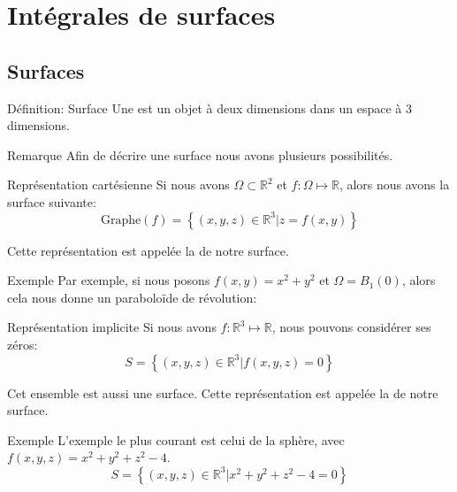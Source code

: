 \documentclass[a4paper]{article}
\begin{document}
\section{Intégrales de surfaces}
\subsection{Surfaces}

\begin{parag}{Définition: Surface}
    Une  est un objet à deux dimensions dans un espace à 3 dimensions. 

    \begin{subparag}{Remarque}
        Afin de décrire une surface nous avons plusieurs possibilités.
    \end{subparag}
\end{parag}

\begin{parag}{Représentation cartésienne}
     Si nous avons $\Omega \subset \mathbb{R}^2$ et $f: \Omega \mapsto \mathbb{R}$, alors nous avons la surface suivante: 
    \[\text{Graphe}\left(f\right) = \left\{\left(x, y, z\right) \in \mathbb{R}^3 | z = f\left(x, y\right)\right\}\]
    
    Cette représentation est appelée la  de notre surface.
   
    \begin{subparag}{Exemple}
        Par exemple, si nous posons $f\left(x, y\right) = x^2 + y^2$ et $\Omega = B_1\left(0\right)$, alors cela nous donne un paraboloïde de révolution:
    \end{subparag}
\end{parag}

\begin{parag}{Représentation implicite}
    Si nous avons $f: \mathbb{R}^3 \mapsto \mathbb{R}$, nous pouvons considérer ses zéros: 
    \[S = \left\{\left(x, y, z\right) \in \mathbb{R}^3 | f\left(x, y, z\right) = 0\right\}\]
    
    Cet ensemble est aussi une surface. Cette représentation est appelée la  de notre surface.

    \begin{subparag}{Exemple}
        L'exemple le plus courant est celui de la sphère, avec $f\left(x, y, z\right) = x^2 + y^2 + z^2 - 4$.
        \[S = \left\{\left(x, y, z\right) \in \mathbb{R}^3 | x^2 + y^2 + z^2 - 4 = 0\right\}\]
    \end{subparag}
\end{parag}
\end{document}
